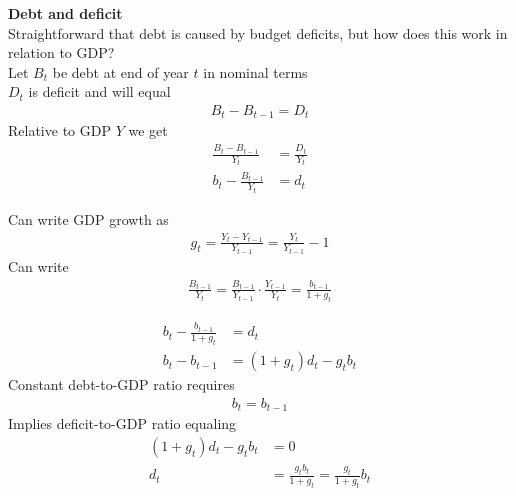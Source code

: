 \documentclass{beamer}
\begin{document}
\begin{frame}
  \textbf{Debt and deficit}\\
  Straightforward that debt is caused by budget deficits, but how does this work in relation to GDP?\\
  \medskip
  Let $B_t$ be debt at end of year $t$ in nominal terms\\
  $D_t$ is deficit and will equal
  \begin{align}
    B_t-B_{t-1}=D_t
 \end{align}  
  \medskip
  Relative to GDP $Y$ we get  
  \begin{align}
    \frac{B_t-B_{t-1}}{Y_t} &= \frac{D_t}{Y_t}\\
    b_t-\frac{B_{t-1}}{Y_t} &= d_t    
  \end{align}
\end{frame}

\begin{frame}
 Can write GDP growth as
 \begin{align}
   g_t=\frac{Y_t-Y_{t-1}}{Y_{t-1}}=\frac{Y_{t}}{Y_{t-1}}-1
 \end{align}
 \medskip
 Can write
 \begin{align}
   \frac{B_{t-1}}{Y_t} = \frac{B_{t-1}}{Y_{t-1}} \cdot \frac{Y_{t-1}}{Y_t} = \frac{b_{t-1}}{1+g_t}  
 \end{align}  
\end{frame}

\begin{frame}
  \begin{align}
    b_t-\frac{b_{t-1}}{1+g_t} &= d_t\\ \nonumber
  b_t-b_{t-1} &= (1+g_t)d_t-g_tb_t  
  \end{align}
  \medskip
  Constant debt-to-GDP ratio requires
  \begin{align}
    b_t=b_{t-1}
  \end{align}
  \medskip Implies deficit-to-GDP ratio equaling 
\begin{align}
  (1+g_t)d_t-g_tb_t &=0 \\ \nonumber
  d_t &= \frac{g_tb_t}{1+g_t} = \frac{g_t}{1+g_t}b_t
\end{align}
\end{frame}
\end{document}
